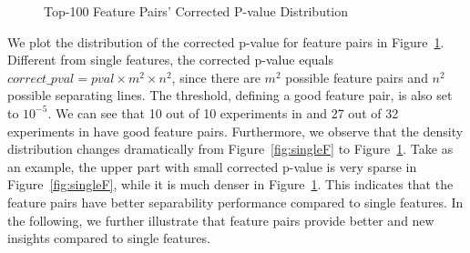 \begin{figure}[h]
\centering     %
\vspace{-5mm}
\vspace{-5mm}
\caption{Top-100 Feature Pairs' Corrected P-value Distribution}
\vspace{-5mm}
\label{fig:FP}
\end{figure}

 We plot the distribution of the corrected p-value for \topk feature pairs in Figure~\ref{fig:FP}. Different from single features, the corrected p-value equals $correct\_pval = pval\times m^2 \times n^2$, since there are $m^2$ possible feature pairs and $n^2$ possible separating lines. The threshold, defining a good feature pair, is also set to $10^{-5}$. We can see that 10 out of 10 experiments in \msig and 27 out of 32 experiments in \lincs have good feature pairs. Furthermore, we observe that the density distribution changes dramatically from Figure~\ref{fig:singleF} to Figure~\ref{fig:FP}. Take \lincs as an example, the upper part with small corrected p-value is very sparse in Figure~\ref{fig:singleF}, while it is much denser in Figure~\ref{fig:FP}. This indicates that the \topk feature pairs have better separability performance compared to single features. In the following, we further illustrate that feature pairs provide better and new insights compared to single features. 

